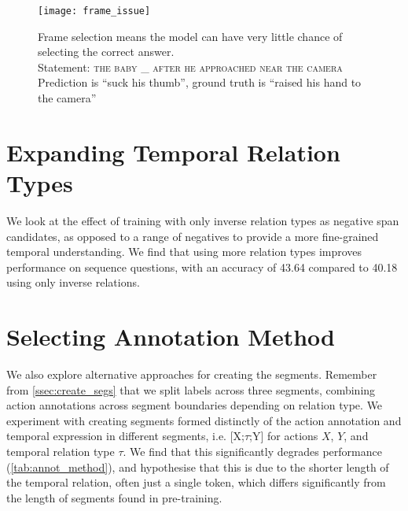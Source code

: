 \begin{figure}[t]
	\centering
	\texttt{[image: frame\_issue]}
	\caption{Frame selection means the model can have very little chance of selecting
	the correct answer.\\
	Statement: \textsc{the baby \_ after he approached near the camera}\\
	Prediction is ``suck his thumb'', ground truth is ``raised his hand to the camera''}
	\label{fig:frame_issue}
\end{figure}

\section{Expanding Temporal Relation Types}
\label{sec:expandtemprel}

We look at the effect of training with only inverse relation types as negative
span candidates, as opposed to a range of negatives to provide a more
fine-grained temporal understanding. We find that using more relation types
improves performance on sequence questions, with an accuracy of 43.64 compared
to 40.18 using only inverse relations.



\section{Selecting Annotation Method}
\label{sec:annot_method}

We also explore alternative approaches for creating the segments. Remember from
\cref{ssec:create_segs} that we split labels across three segments, combining
action annotations across segment boundaries depending on relation type. We
experiment with creating segments formed distinctly of the action annotation
and temporal expression in different segments, i.e. \mbox{[X;$\tau$;Y]} for
actions $X$, $Y$, and temporal relation type $\tau$. We find that this
significantly degrades performance (\cref{tab:annot_method}), and hypothesise
that this is due to the shorter length of the temporal relation, often just a
single token, which differs significantly from the length of segments found in
pre-training.


